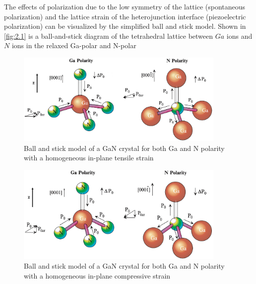 The effects of polarization due to the low symmetry of the lattice (spontaneous  polarization) and the lattice strain  of the heterojunction interface  (piezoelectric  polarization) can be visualized by the simplified ball and stick model. Shown in \autoref{fig:2.1} is a ball-and-stick diagram of the tetrahedral lattice between $Ga$ ions and $N$ ions in the relaxed Ga-polar and N-polar 

\begin{figure}[H] 
\centering    
\includegraphics[width=0.9\textwidth]{ch2_2}
\caption[Ball and stick model of a GaN crystal for both Ga and N polarity with a homogeneous in-plane tensile strain]{Ball and stick model of a GaN crystal for both Ga and N polarity with a homogeneous in-plane tensile strain \protect\cite{morkoc2008polarization}}
\label{fig:2.2}
\end{figure}

\begin{figure}[H] 
\centering    
\includegraphics[width=0.9\textwidth]{ch2_3}
\caption[Ball and stick model of a GaN crystal for both Ga and N polarity with a homogeneous in-plane compressive strain]{Ball and stick model of a GaN crystal for both Ga and N polarity with a homogeneous in-plane compressive strain \protect\cite{morkoc2008polarization}}
\label{fig:2.3}
\end{figure}

